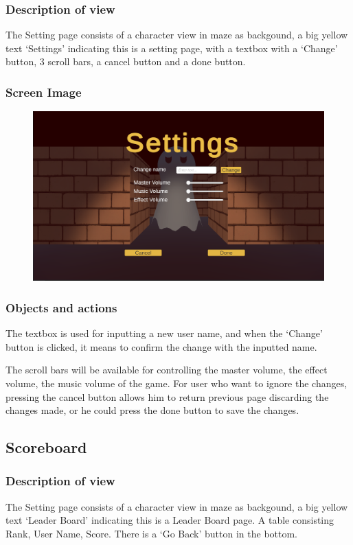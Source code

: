 \documentclass[11pt]{article}
\begin{document}
\subsubsection{Description of view}
The Setting page consists of a character view in maze as backgound, a big yellow text `Settings' indicating this is a setting page, with a textbox with a `Change' button, 3 scroll bars, a cancel button and a done button.
\subsubsection{Screen Image}
\begin{figure}[H]
    \centering
    \includegraphics*[scale=0.2]{UI1.2Settings.png}
\end{figure}
\subsubsection{Objects and actions}
The textbox is used for inputting a new user name, and when the `Change' button is clicked, it means to confirm the change with the inputted name.

The scroll bars will be available for controlling the master volume, the effect volume, the music volume of the game. For user who want to ignore the changes, pressing the cancel button allows him to return previous page discarding the changes made, or he could press the done button to save the changes.

\subsection{Scoreboard}
\subsubsection{Description of view}
The Setting page consists of a character view in maze as backgound, a big yellow text `Leader Board' indicating this is a Leader Board page. A table consisting Rank, User Name, Score. There is a `Go Back' button in the bottom.
\end{document}
